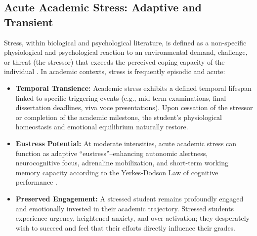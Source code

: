 \documentclass[12pt,a4paper,oneside]{report}
\begin{document}
\subsection{Acute Academic Stress: Adaptive and Transient}
Stress, within biological and psychological literature, is defined as a non-specific physiological and psychological reaction to an environmental demand, challenge, or threat (the stressor) that exceeds the perceived coping capacity of the individual \cite{selye1976}. In academic contexts, stress is frequently episodic and acute:
\begin{itemize}
    \item \textbf{Temporal Transience:} Academic stress exhibits a defined temporal lifespan linked to specific triggering events (e.g., mid-term examinations, final dissertation deadlines, viva voce presentations). Upon cessation of the stressor or completion of the academic milestone, the student's physiological homeostasis and emotional equilibrium naturally restore.
    \item \textbf{Eustress Potential:} At moderate intensities, acute academic stress can function as adaptive ``eustress''--enhancing autonomic alertness, neurocognitive focus, adrenaline mobilization, and short-term working memory capacity according to the Yerkes-Dodson Law of cognitive performance \cite{yerkes1908}.
    \item \textbf{Preserved Engagement:} A stressed student remains profoundly engaged and emotionally invested in their academic trajectory. Stressed students experience urgency, heightened anxiety, and over-activation; they desperately wish to succeed and feel that their efforts directly influence their grades.
\end{itemize}
\end{document}
